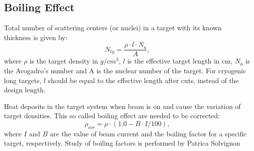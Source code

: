 \documentclass[a4paper,12.pt]{article}
\begin{document}
\subsection{Boiling Effect}
Total number of scattering centers (or nuclei) in a target with its known thickness is given by:
\begin{equation}
 N_{tg} = \frac{\rho\cdot l \cdot N_{a}}{A},
 \label{eq_ntg}
\end{equation}
where $\rho$ is the target density in $g/cm^{3}$, $l$ is the effective target length in cm, $N_{a}$ is the Avogadro's number and A is the nuclear number of the target. For cryogenic long targets, $l$ should be equal to the effective length after cuts, instead of the design length.

Heat deposits in the target system when beam is on and cause the variation of target densities. This so called boiling effect are needed to be corrected:
\begin{equation}
  \rho_{cor} = \rho \cdot (1.0 - B \cdot I /100),
   \label{eq_tgrho}
\end{equation}
where $I$ and $B$ are the value of beam current and the boiling factor for a specific target, respectively. Study of boiling factors is performed by Patrica Solvignon %
\end{document}
